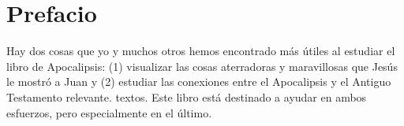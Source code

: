 \ClearShipoutPicture
{}

\blankpage
\clearpage
\clearpage

\begin{KeepFromToc}
\tableofcontents
\end{KeepFromToc}
\clearpage
\listoffigures
\clearpage

\chapter{Prefacio}
Hay dos cosas que yo y muchos otros hemos encontrado más útiles al estudiar el libro de Apocalipsis: (1) visualizar las cosas aterradoras y maravillosas que Jesús le mostró a Juan y (2) estudiar las conexiones entre el Apocalipsis y el Antiguo Testamento relevante. textos. Este libro está destinado a ayudar en ambos esfuerzos, pero especialmente en el último. \\

